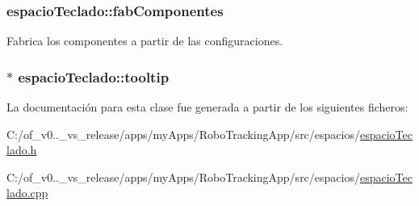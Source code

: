 \subsubsection[{fab\+Componentes}]{ espacio\+Teclado\+::fab\+Componentes\hspace{0.3cm}{\ttfamily [private]}}\label{classespacio_teclado_aaa53bfd0abe00de252f38c299174f0d1}


Fabrica los componentes a partir de las configuraciones. 

\hypertarget{classespacio_teclado_a795ef319723578fffd7d3d1cb8db982e}{}
\subsubsection[{tooltip}]{$\ast$ espacio\+Teclado\+::tooltip\hspace{0.3cm}{\ttfamily [private]}}\label{classespacio_teclado_a795ef319723578fffd7d3d1cb8db982e}


La documentación para esta clase fue generada a partir de los siguientes ficheros\+:\begin{DoxyCompactItemize}
\item 
C\+:/of\+\_\+v0..\+\_\+vs\+\_\+release/apps/my\+Apps/\+Robo\+Tracking\+App/src/espacios/\hyperlink{espacio_teclado_8h}{espacio\+Teclado.\+h}\item 
C\+:/of\+\_\+v0..\+\_\+vs\+\_\+release/apps/my\+Apps/\+Robo\+Tracking\+App/src/espacios/\hyperlink{espacio_teclado_8cpp}{espacio\+Teclado.\+cpp}\end{DoxyCompactItemize}
